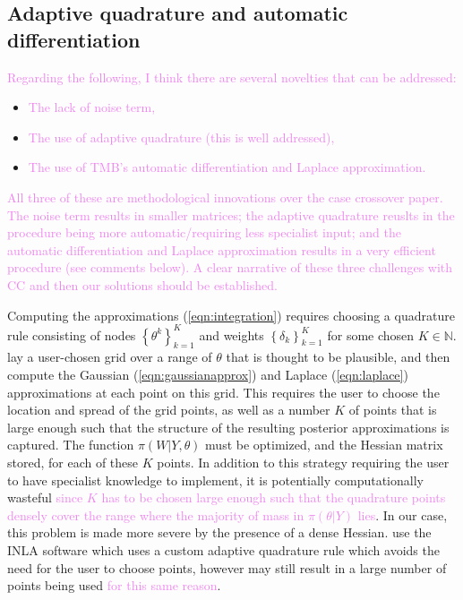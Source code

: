 \documentclass[ba]{imsart}
\newcommand{\alex}[1]{\textcolor{violet}{{ }#1}}
\begin{document}
\subsection{Adaptive quadrature and automatic differentiation}

\alex{Regarding the following, I think there are several novelties that can be addressed:}

\begin{itemize}
\item \alex{The lack of noise term,}
\item \alex{The use of adaptive quadrature (this is well addressed),}
\item \alex{The use of TMB's automatic differentiation and Laplace approximation.}
\end{itemize}
\alex{All three of these are methodological innovations over the case crossover paper. The noise term results in smaller matrices; the adaptive quadrature 
reuslts in the procedure being more automatic/requiring less specialist input; and the automatic differentiation and Laplace approximation results
in a very efficient procedure (see comments below). A clear narrative of these three challenges with CC and then our solutions should be established.
}

Computing the approximations (\ref{eqn:integration}) requires choosing a quadrature rule consisting of nodes $\left\{\theta^{k}\right\}_{k=1}^{K}$ and weights $\left\{\delta_{k}\right\}_{k=1}^{K}$ for some chosen $K\in\mathbb{N}$. \cite{casecross} lay a user-chosen grid over a range of $\theta$ that is thought to be plausible, and then compute the Gaussian (\ref{eqn:gaussianapprox}) and Laplace (\ref{eqn:laplace}) approximations at each point on this grid. This requires the user to choose the location and spread of the grid points, as well as a number $K$
of points that is large enough such that the structure of the resulting posterior approximations is captured. The function $\pi(W|Y,\theta)$ must be optimized, and the Hessian matrix stored, for each of these $K$ points. In addition to this strategy requiring the user to have specialist knowledge to implement, it is potentially computationally wasteful\alex{since $K$ has to be chosen large enough such that the quadrature points densely cover the range where the majority of mass in $\pi(\theta|Y)$ lies}. In our case, this problem is made more severe by the presence of a dense Hessian. \cite{inlacoxph} use the INLA software which uses a custom adaptive quadrature rule which avoids the need for the user to choose points, however may still result in a large number of points being used\alex{for this same reason}.
\end{document}
